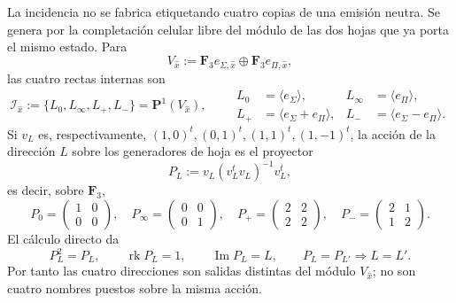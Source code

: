La incidencia no se fabrica etiquetando cuatro copias de una emisión neutra.
Se genera por la completación celular libre del módulo de las dos hojas que
ya porta el mismo estado. Para
\[
 V_{\widehat x}:=\mathbf F_3e_{\Sigma,\widehat x}
 \oplus\mathbf F_3e_{\Pi,\widehat x},
\]
las cuatro rectas internas son
\begin{equation}
\label{rm:eq:pdfv2-cor-cuatro-rectas-tpk}
 \mathscr I_{\widehat x}:=
 \{L_0,L_\infty,L_+,L_-\}
 =\mathbf P^1(V_{\widehat x}),\qquad
 \begin{aligned}
 L_0&=\langle e_\Sigma\rangle,&
 L_\infty&=\langle e_\Pi\rangle,\\
 L_+&=\langle e_\Sigma+e_\Pi\rangle,&
 L_-&=\langle e_\Sigma-e_\Pi\rangle.
 \end{aligned}
\end{equation}
Si \(v_L\) es, respectivamente,
\((1,0)^t,(0,1)^t,(1,1)^t,(1,-1)^t\), la acción de la dirección \(L\)
sobre los generadores de hoja es el proyector
\begin{equation}
\label{rm:eq:pdfv2-cor-proyectores-cuatro-direcciones}
 P_L:=v_L(v_L^tv_L)^{-1}v_L^t,
\end{equation}
es decir, sobre \(\mathbf F_3\),
\[
 P_0=\begin{pmatrix}1&0\\0&0\end{pmatrix},\quad
 P_\infty=\begin{pmatrix}0&0\\0&1\end{pmatrix},\quad
 P_+=\begin{pmatrix}2&2\\2&2\end{pmatrix},\quad
 P_-=\begin{pmatrix}2&1\\1&2\end{pmatrix}.
\]
El cálculo directo da
\begin{equation}
\label{rm:eq:pdfv2-cor-proyectores-no-colapso}
 P_L^2=P_L,\qquad \operatorname{rk}P_L=1,\qquad
 \operatorname{Im}P_L=L,\qquad
 P_L=P_{L'}\Longrightarrow L=L'.
\end{equation}
Por tanto las cuatro direcciones son salidas distintas del módulo
\(V_{\widehat x}\); no son cuatro nombres puestos sobre la misma acción.

